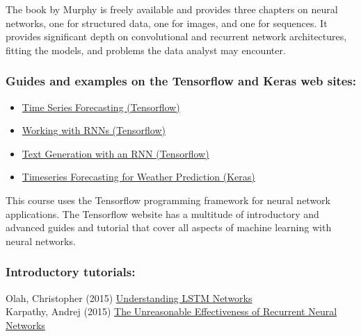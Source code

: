 The book by Murphy is freely available and provides three chapters on neural networks, one for structured data, one for images, and one for sequences. It provides significant depth on convolutional and recurrent network architectures, fitting the models, and problems the data analyst may encounter. 

\begin{withcode}
\begin{resourcebox}
\subsubsection*{Guides and examples on the Tensorflow and Keras web sites:}

\begin{itemize}
\item \href{https://www.tensorflow.org/tutorials/structured_data/time_series}{Time Series Forecasting (Tensorflow)} \\
\item \href{https://www.tensorflow.org/guide/keras/working_with_rnns}{Working with RNNs (Tensorflow)} \\
\item \href{https://www.tensorflow.org/text/tutorials/text_generation}{Text Generation with an RNN (Tensorflow)} \\
\item \href{https://keras.io/examples/timeseries/timeseries_weather_forecasting/}{Timeseries Forecasting for Weather Prediction (Keras)}
\end{itemize}
\end{resourcebox}

This course uses the Tensorflow programming framework for neural network applications. The Tensorflow website has a multitude of introductory and advanced guides and tutorial that cover all aspects of machine learning with neural networks. 
\end{withcode}

\begin{resourcebox}
\subsubsection*{Introductory tutorials:}

Olah, Christopher (2015) \href{https://colah.github.io/posts/2015-08-Understanding-LSTMs/}{Understanding LSTM Networks} \\

Karpathy, Andrej (2015) \href{https://karpathy.github.io/2015/05/21/rnn-effectiveness/}{The Unreasonable Effectiveness of Recurrent Neural Networks}
\end{resourcebox}

